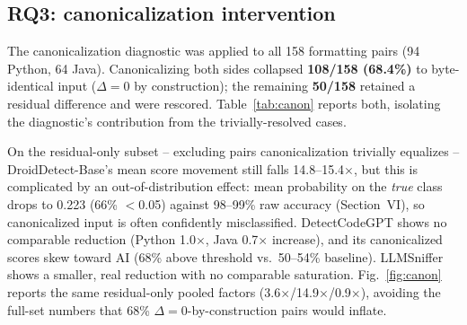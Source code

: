 \documentclass[10pt,conference]{IEEEtran}
\begin{document}
\subsection{RQ3: canonicalization intervention}

The canonicalization diagnostic was applied to all 158 formatting pairs (94 Python, 64 Java). Canonicalizing both sides collapsed \textbf{108/158 (68.4\%)} to byte-identical input ($\Delta{=}0$ by construction); the remaining \textbf{50/158} retained a residual difference and were rescored. Table~\ref{tab:canon} reports both, isolating the diagnostic's contribution from the trivially-resolved cases.

\begin{table}[t]
\centering
\caption{Mean $|\Delta|$ before/after canonicalization, by language (not comparable across detectors).}
\label{tab:canon}
\end{table}

On the residual-only subset -- excluding pairs canonicalization trivially equalizes -- DroidDetect-Base's mean score movement still falls 14.8--15.4$\times$, but this is complicated by an out-of-distribution effect: mean probability on the \emph{true} class drops to 0.223 (66\% $<$0.05) against 98--99\% raw accuracy (Section~VI), so canonicalized input is often confidently misclassified. DetectCodeGPT shows no comparable reduction (Python 1.0$\times$, Java 0.7$\times$ increase), and its canonicalized scores skew toward AI (68\% above threshold vs.\ 50--54\% baseline). LLMSniffer shows a smaller, real reduction with no comparable saturation. Fig.~\ref{fig:canon} reports the same residual-only pooled factors (3.6$\times$/14.9$\times$/0.9$\times$), avoiding the full-set numbers that 68\% $\Delta{=}0$-by-construction pairs would inflate.
\end{document}
